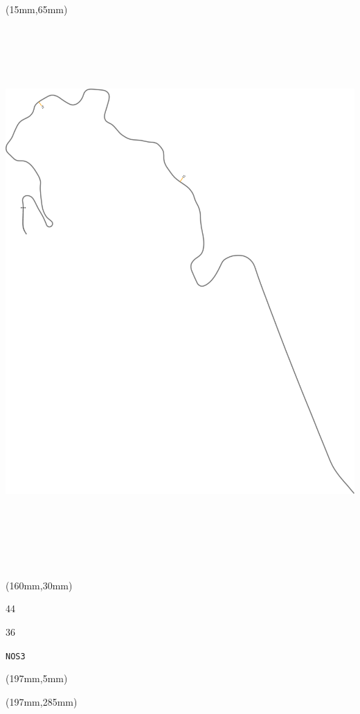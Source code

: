 \begin{textblock*}{185mm}(15mm,65mm)%
\centering
\mbox{\includegraphics[width=185mm,height=210mm,keepaspectratio]{PT/NOS3.pdf}}
\end{textblock*}
\begin{textblock*}{40mm}(160mm,30mm)%
\Large
\par{} 
\par44 
\par36 
\par\hfill\tiny\tt NOS3\\
\end{textblock*}
\begin{textblock*}{20mm}(197mm,5mm)%
\fbox{\thepage}
\label{NOS3}
\end{textblock*}
\begin{textblock*}{20mm}(197mm,285mm)%
\fbox{\thepage}
\end{textblock*}

